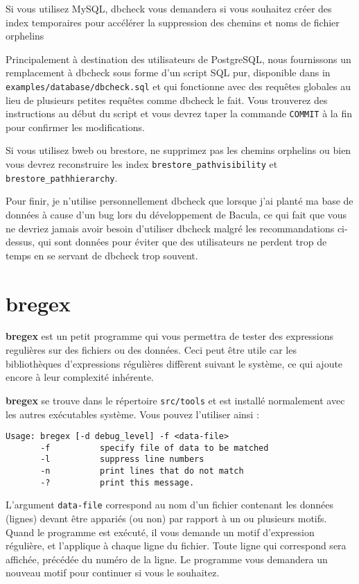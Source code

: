 Si vous utilisez MySQL, dbcheck vous demandera si vous souhaitez créer des index
temporaires pour accélérer la suppression des chemins et noms de fichier 
orphelins

Principalement à destination des utilisateurs de PostgreSQL, nous fournissons
un remplacement à dbcheck sous forme d'un script SQL pur, disponible dans
in \texttt{examples/database/dbcheck.sql} et qui fonctionne avec des requêtes
globales au lieu de plusieurs petites requêtes comme dbcheck le fait. Vous
trouverez des instructions au début du script et vous devrez taper la commande
\texttt{COMMIT} à la fin pour confirmer les modifications.

Si vous utilisez bweb ou brestore, ne supprimez pas les chemins orphelins ou
bien vous devrez reconstruire les index \texttt{brestore\_pathvisibility} et
\texttt{brestore\_pathhierarchy}.

Pour finir, je n'utilise personnellement dbcheck que lorsque j'ai planté ma
base de données à cause d'un bug lors du développement de Bacula, ce qui fait
que vous ne devriez jamais avoir besoin d'utiliser dbcheck malgré les 
recommandations ci-dessus, qui sont données pour éviter que des utilisateurs
ne perdent trop de temps en se servant de dbcheck trop souvent.

\section{bregex}
\label{bregex}

{\bf bregex} est un petit programme qui vous permettra de tester des expressions
regulières sur des fichiers ou des données. Ceci peut être utile car les 
bibliothèques d'expressions régulières diffèrent suivant le système, ce qui
ajoute encore à leur complexité inhérente.

{\bf bregex} se trouve dans le répertoire \texttt{src/tools} et est installé 
normalement avec les autres exécutables système. Vous pouvez l'utiliser ainsi :

\begin{verbatim}
Usage: bregex [-d debug_level] -f <data-file>
       -f          specify file of data to be matched
       -l          suppress line numbers
       -n          print lines that do not match
       -?          print this message.
\end{verbatim}

L'argument \texttt{\lt{}data-file\gt{}} correspond au nom d'un fichier contenant
les données (lignes) devant être appariés (ou non) par rapport à un ou plusieurs
motifs. Quand le programme est exécuté, il vous demande un motif d'expression
régulière, et l'applique à chaque ligne du fichier. Toute ligne qui correspond
sera affichée, précédée du numéro de la ligne. Le programme vous demandera un
nouveau motif pour continuer si vous le souhaitez.

